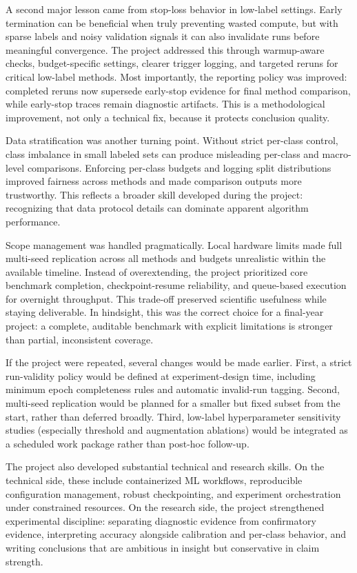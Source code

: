 A second major lesson came from stop-loss behavior in low-label settings. Early termination can be beneficial when truly preventing wasted compute, but with sparse labels and noisy validation signals it can also invalidate runs before meaningful convergence. The project addressed this through warmup-aware checks, budget-specific settings, clearer trigger logging, and targeted reruns for critical low-label methods. Most importantly, the reporting policy was improved: completed reruns now supersede early-stop evidence for final method comparison, while early-stop traces remain diagnostic artifacts. This is a methodological improvement, not only a technical fix, because it protects conclusion quality.

Data stratification was another turning point. Without strict per-class control, class imbalance in small labeled sets can produce misleading per-class and macro-level comparisons. Enforcing per-class budgets and logging split distributions improved fairness across methods and made comparison outputs more trustworthy. This reflects a broader skill developed during the project: recognizing that data protocol details can dominate apparent algorithm performance.

Scope management was handled pragmatically. Local hardware limits made full multi-seed replication across all methods and budgets unrealistic within the available timeline. Instead of overextending, the project prioritized core benchmark completion, checkpoint-resume reliability, and queue-based execution for overnight throughput. This trade-off preserved scientific usefulness while staying deliverable. In hindsight, this was the correct choice for a final-year project: a complete, auditable benchmark with explicit limitations is stronger than partial, inconsistent coverage.

If the project were repeated, several changes would be made earlier. First, a strict run-validity policy would be defined at experiment-design time, including minimum epoch completeness rules and automatic invalid-run tagging. Second, multi-seed replication would be planned for a smaller but fixed subset from the start, rather than deferred broadly. Third, low-label hyperparameter sensitivity studies (especially threshold and augmentation ablations) would be integrated as a scheduled work package rather than post-hoc follow-up.

The project also developed substantial technical and research skills. On the technical side, these include containerized ML workflows, reproducible configuration management, robust checkpointing, and experiment orchestration under constrained resources. On the research side, the project strengthened experimental discipline: separating diagnostic evidence from confirmatory evidence, interpreting accuracy alongside calibration and per-class behavior, and writing conclusions that are ambitious in insight but conservative in claim strength.

